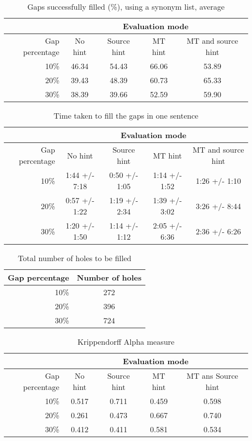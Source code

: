 \documentclass[11pt, oneside]{article}   	%
\begin{document}
\begin{table}[H]
\centering
\begin{tabular}{|r |*{4}{c}|}
\hline
 &\multicolumn{4}{c|}{Evaluation mode}\\
\hline
Gap percentage & No hint & Source hint & MT hint & MT and source hint\\
\hline
10\%&46.34&54.43&66.06&53.89\\
20\%&39.43&48.39&60.73&65.33\\
30\%&38.39&39.66&52.59&59.90\\
\hline
\end{tabular}
\caption {Gaps successfully filled (\%), using a synonym list, average} \label{tab:title} 
\end{table}

\begin{table}[H]
\centering
\begin{tabular}{|r |*{4}{c}|}
\hline
 &\multicolumn{4}{c|}{Evaluation mode}\\
\hline
Gap percentage & No hint & Source hint & MT hint & MT and source hint\\
\hline
10\%&1:44 +/- 7:18&0:50 +/- 1:05&1:14 +/- 1:52&1:26 +/- 1:10\\
20\%&0:57 +/- 1:22&1:19 +/- 2:34&1:39 +/- 3:02&3:26 +/- 8:44\\
30\%&1:20 +/- 1:50&1:14 +/- 1:12&2:05 +/- 6:36&2:36 +/- 6:26\\
\hline
\end{tabular}
\caption {Time taken to fill the gaps in one sentence} \label{tab:title} 
\end{table}

\begin{table}[H]
\centering
\begin{tabular}{|r |*{1}{c}|}
\hline
Gap percentage & Number of holes\\
\hline
10\%&272\\
20\%&396\\
30\%&724\\
\hline
\end{tabular}
\caption {Total number of holes to be filled} \label{tab:title}
\end{table}

\begin{table}[H]
\centering
\begin{tabular}{|r |*{4}{c}|}
\hline
 &\multicolumn{4}{c|}{Evaluation mode}\\
\hline
Gap percentage & No hint & Source hint & MT hint & MT ans Source hint\\
\hline
10\%&0.517 &0.711 &0.459 &0.598\\
20\%&0.261 &0.473 &0.667 &0.740\\
30\%&0.412 &0.411 &0.581 &0.534\\
\hline
\end{tabular}
\caption {Krippendorff Alpha measure} \label{tab:title}
\end{table}
\end{document}
